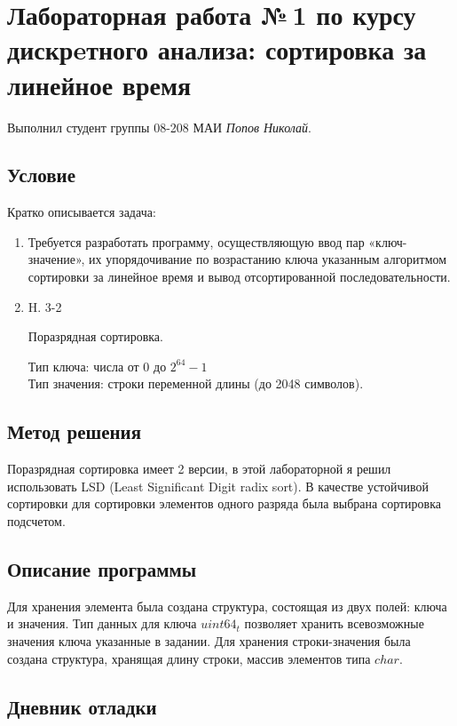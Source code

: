\documentclass[12pt]{article}
\begin{document}
\section*{Лабораторная работа №\,1 по курсу дискрeтного анализа: сортировка за линейное время}

Выполнил студент группы 08-208 МАИ \textit{Попов Николай}.

\subsection*{Условие}

Кратко описывается задача: 
\begin{enumerate}
\item 

Требуется разработать программу, осуществляющую ввод пар «ключ-значение», их упорядочивание по возрастанию ключа указанным алгоритмом сортировки за линейное время и вывод отсортированной последовательности.

\item H. 3-2 

Поразрядная сортировка.

Тип ключа: числа от 0 до $2^{64}-1$  \\
Тип значения: строки переменной длины (до 2048 символов).

\end{enumerate}

\subsection*{Метод решения}

Поразрядная сортировка имеет 2 версии, в этой лабораторной я решил использовать
LSD (Least Significant Digit radix sort). В качестве устойчивой сортировки для сортировки 
элементов одного разряда была выбрана сортировка подсчетом.

\subsection*{Описание программы}

Для хранения элемента была создана структура, состоящая из двух полей: ключа и значения.
Тип данных для ключа $uint64_t$ позволяет хранить всевозможные значения ключа указанные в задании. 
Для хранения строки-значения была создана структура, хранящая длину строки, массив элементов типа $char$.


\subsection*{Дневник отладки}
\end{document}
